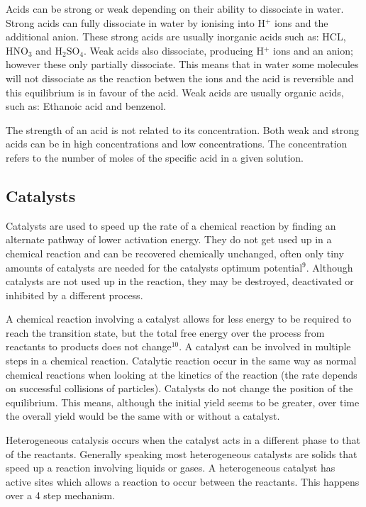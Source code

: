 Acids can be strong or weak depending on their ability to dissociate in water. Strong acids can fully dissociate in water by ionising into H$^+$ ions and the additional anion. These strong acids are usually inorganic acids such as: HCL, HNO$_3$ and H$_2$SO$_4$. Weak acids also dissociate, producing H$^+$ ions and an anion; however these only partially dissociate. This means that in water some molecules will not dissociate as the reaction betwen the ions and the acid is reversible and this equilibrium is in favour of the acid. Weak acids are usually organic acids, such as: Ethanoic acid and benzenol. 

The strength of an acid is not related to its concentration. Both weak and strong acids can be in high concentrations and low concentrations. The concentration refers to the number of moles of the specific acid in a given solution.



	\subsection{Catalysts}

Catalysts are used to speed up the rate of a chemical reaction by finding an alternate pathway of lower activation energy. They do not get used up in a chemical reaction and can be recovered chemically unchanged, often only tiny amounts of catalysts are needed for the catalysts optimum potential$^9$. Although catalysts are not used up in the reaction, they may be destroyed, deactivated or inhibited by a different process. 

A chemical reaction involving a catalyst allows for less energy to be required to reach the transition state, but the total free energy over the process from reactants to products does not change$^{10}$. A catalyst can be involved in multiple steps in a chemical reaction. Catalytic reaction occur in the same way as normal chemical reactions when looking at the kinetics of the reaction (the rate depends on successful collisions of particles). Catalysts do not change the position of the equilibrium. This means, although the initial yield seems to be greater, over time the overall yield would be the same with or without a catalyst. 

Heterogeneous catalysis occurs when the catalyst acts in a different phase to that of the reactants. Generally speaking most heterogeneous catalysts are solids that speed up a reaction involving liquids or gases. A heterogeneous catalyst has active sites which allows a reaction to occur between the reactants. This happens over a 4 step mechanism.


